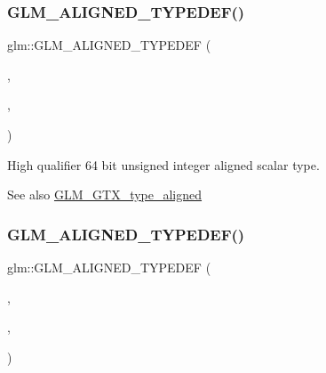 \subsubsection{\texorpdfstring{G\+L\+M\+\_\+\+A\+L\+I\+G\+N\+E\+D\+\_\+\+T\+Y\+P\+E\+D\+E\+F()}{GLM\_ALIGNED\_TYPEDEF()}\hspace{0.1cm}{\footnotesize\ttfamily [96/209]}}
{\footnotesize\ttfamily glm\+::\+G\+L\+M\+\_\+\+A\+L\+I\+G\+N\+E\+D\+\_\+\+T\+Y\+P\+E\+D\+EF (\begin{DoxyParamCaption}\item[{\mbox{\hyperlink{group__gtc__type__precision_ga8079c653e20cda03d34b99de629a7b09}{highp\+\_\+uint64}}}]{,  }\item[{aligned\+\_\+highp\+\_\+uint64}]{,  }\item[{8}]{ }\end{DoxyParamCaption})}

High qualifier 64 bit unsigned integer aligned scalar type. \begin{DoxySeeAlso}{See also}
\mbox{\hyperlink{group__gtx__type__aligned}{G\+L\+M\+\_\+\+G\+T\+X\+\_\+type\+\_\+aligned}} 
\end{DoxySeeAlso}
\mbox{\label{group__gtx__type__aligned_gaff50b10dd1c48be324fdaffd18e2c7ea}} 
\subsubsection{\texorpdfstring{G\+L\+M\+\_\+\+A\+L\+I\+G\+N\+E\+D\+\_\+\+T\+Y\+P\+E\+D\+E\+F()}{GLM\_ALIGNED\_TYPEDEF()}\hspace{0.1cm}{\footnotesize\ttfamily [97/209]}}
{\footnotesize\ttfamily glm\+::\+G\+L\+M\+\_\+\+A\+L\+I\+G\+N\+E\+D\+\_\+\+T\+Y\+P\+E\+D\+EF (\begin{DoxyParamCaption}\item[{\mbox{\hyperlink{group__gtc__type__precision_ga9ba529fcc75b82d23da979f0ce6e4518}{highp\+\_\+uint8\+\_\+t}}}]{,  }\item[{aligned\+\_\+highp\+\_\+uint8\+\_\+t}]{,  }\item[{1}]{ }\end{DoxyParamCaption})}

